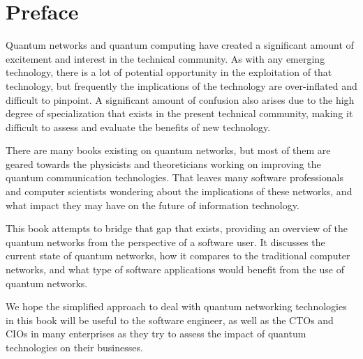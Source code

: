 \chapter*{Preface}

Quantum networks and quantum computing have created a significant amount of excitement and interest in the technical community. As with any emerging technology, there is a lot of potential opportunity in the exploitation of that technology, but frequently the implications of the technology are over-inflated and difficult to pinpoint. A significant amount of confusion also arises due to the high degree of specialization that exists in the present technical community, making it difficult to assess and evaluate the benefits of new technology. 

There are many books existing on quantum networks, but most of them are geared towards the physicists and theoreticians working on improving the quantum communication technologies. That leaves many software professionals and computer scientists wondering about the implications of these networks, and what impact they may have on the future of information technology. 

This book attempts to bridge that gap that exists, providing an overview of the quantum networks from the perspective of a software user. It discusses the current state of quantum networks, how it compares to the traditional computer networks, and what type of software applications would benefit from the use of quantum networks. 

We hope the simplified approach to deal with quantum networking technologies in this book will be useful to the software engineer, as well as the CTOs and CIOs in many enterprises as they try to assess the impact of quantum technologies on their businesses. 
